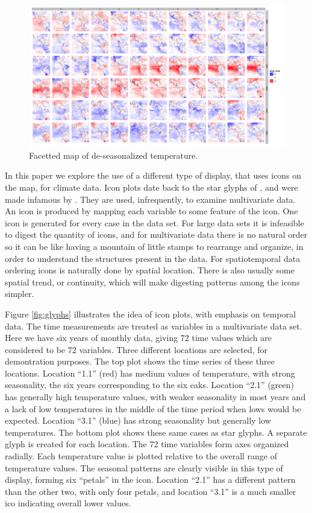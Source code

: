 \documentclass[oneside]{article}
\begin{document}
\begin{figure}[htp]
\centerline{\includegraphics[width=6in]{nasa-colored-map.png}}
\caption{Facetted map of de-seasonalized temperature.}
\label{fig:facetted-map}
\end{figure}

In this paper we explore the use of a different type of display, that uses icons on the map, for climate data. Icon plots date back to the star glyphs of  \citep{kleiner}, and were made infamous by \citep{Chernoff}. They are used, infrequently, to examine multivariate data. An icon is produced by mapping each variable to some feature of the icon. One icon is generated for every case in the data set. For large data sets it is infeasible to digest the quantity of icons, and for multivariate data there is no natural order so it can be like having a mountain of little stamps to rearrange and organize, in order to understand the structures present in the data. For spatiotemporal data ordering icons is naturally done by spatial location. There is also usually some spatial trend, or continuity, which will make digesting patterns among the icons simpler.

Figure \ref{fig:glyphs} illustrates the idea of icon plots, with emphasis on temporal data. The time measurements are treated as variables in a multivariate data set. Here we have six years of monthly data, giving 72 time values which are considered to be 72 variables. Three different locations are selected, for demontration purposes. The top plot shows the time series of these three locations. Location ``1.1'' (red) has medium values of temperature, with strong seasonality, the six years corresponding to the six eaks. Location ``2.1'' (green) has generally high temperature values, with weaker seasonality in most years and a lack of low temperatures in the middle of the time period when lows would be expected. Location ``3.1'' (blue) has strong seasonality but generally low temperatures. The bottom plot shows these same cases as star glyphs. A separate glyph is created for each location. The 72 time variables form axes organized radially. Each temperature value is plotted relative to the overall range of temperature values. The seasonal patterns are clearly visible in this type of display, forming six ``petals'' in the icon. Location ``2.1'' has a different pattern than the other two, with only four petals, and location ``3.1'' is a much smaller ico indicating overall lower values. 
\end{document}
